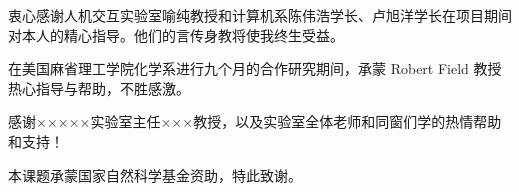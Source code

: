 
\begin{acknowledgements}
  衷心感谢人机交互实验室喻纯教授和计算机系陈伟浩学长、卢旭洋学长在项目期间对本人的精心指导。他们的言传身教将使我终生受益。

  在美国麻省理工学院化学系进行九个月的合作研究期间，承蒙 Robert Field 教授热心指导与帮助，不胜感激。

  感谢×××××实验室主任×××教授，以及实验室全体老师和同窗们学的热情帮助和支持！

  本课题承蒙国家自然科学基金资助，特此致谢。
\end{acknowledgements}
